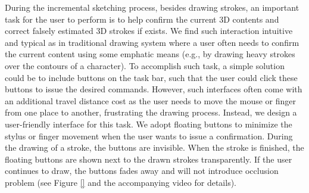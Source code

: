During the incremental sketching process, besides drawing strokes, an important task for the user to perform is to help confirm the current 3{D} contents and correct falsely estimated 3{D} strokes if exists. We find such interaction intuitive and typical as in traditional drawing system where a user often needs to confirm the current content using some emphatic means (e.g., by drawing heavy strokes over the contours of a character). To accomplish such task, a simple solution could be to include buttons on the task bar, such that the user could click these buttons to issue the desired commands. However, such interfaces often come with an additional travel distance cost as the user needs to move the mouse or finger from one place to another, frustrating the drawing process. Instead, we design a user-friendly interface for this task. We adopt floating buttons to minimize the stylus or finger movement when the user wants to issue a confirmation. During the drawing of a stroke, the buttons are invisible. When the stroke is finished, the floating buttons are shown next to the drawn strokes transparently. If the user continues to draw, the buttons fades away and will not introduce occlusion problem (see Figure \ref{} and the accompanying video for details).














